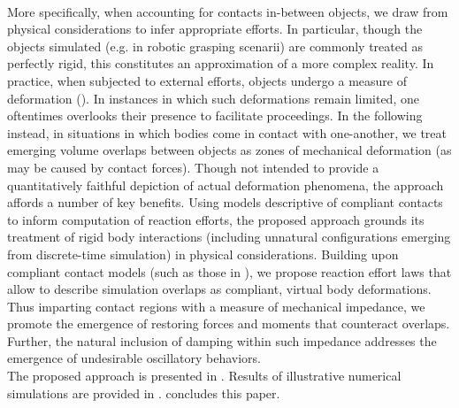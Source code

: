 \\[5pt]
\indent More specifically, when accounting for contacts in-between objects, we draw from physical considerations to infer appropriate efforts. In particular, though the objects simulated (e.g. in robotic grasping scenarii) are commonly treated as perfectly rigid, this constitutes an approximation of a more complex reality. In practice, when subjected to external efforts, objects undergo a measure of deformation (\cite{stoianovici1996critical}). In instances in which such deformations remain limited, one oftentimes overlooks their presence to facilitate proceedings. In the following instead, in situations in which bodies come in contact with one-another, we treat emerging volume overlaps between objects as zones of mechanical deformation (as may be caused by contact forces). Though not intended to provide a quantitatively faithful depiction of actual deformation phenomena, the approach affords a number of key benefits. Using models descriptive of compliant contacts to inform computation of reaction efforts, the proposed approach grounds its treatment of rigid body interactions (including unnatural configurations emerging from discrete-time simulation) in physical considerations. Building upon compliant contact models (such as those in \cite{diolaiti2005}), we propose reaction effort laws that allow to describe simulation overlaps as compliant, virtual body deformations. Thus imparting contact regions with a measure of mechanical impedance, we promote the emergence of restoring forces and moments that counteract overlaps. Further, the natural inclusion of damping within such impedance addresses the emergence of undesirable oscillatory behaviors.
\\[5pt]
\indent The proposed approach is presented in . Results of illustrative numerical simulations are provided in .  concludes this paper. 